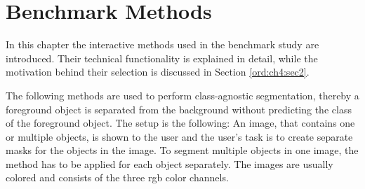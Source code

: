 
\chapter{Benchmark Methods}\label{ord:ch3}

In this chapter the interactive methods used in the benchmark study are introduced.
Their technical functionality is explained in detail, while the motivation behind their selection is discussed in Section \ref{ord:ch4:sec2}.

The following methods are used to perform class-agnostic segmentation, thereby a foreground object is separated from the background without predicting the class of the foreground object.
The setup is the following: An image, that contains one or multiple objects, is shown to the user and the user's task is to create separate masks for the objects in the image.
To segment multiple objects in one image, the method has to be applied for each object separately.
The images are usually colored and consists of the three \gls{rgb} color channels.





